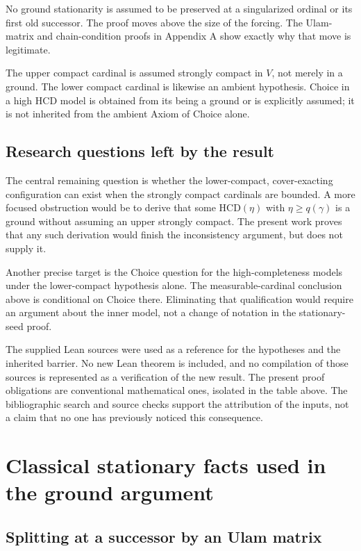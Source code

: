 \documentclass[11pt,letterpaper]{article}
\theoremstyle{definition}
\numberwithin{equation}{section}
\newcommand{\HCD}{\mathrm{HCD}}
\begin{document}
No ground stationarity is assumed to be preserved at a singularized
ordinal or its first old successor. The proof moves above the size of
the forcing. The Ulam-matrix and chain-condition proofs in Appendix A
show exactly why that move is legitimate.

The upper compact cardinal is assumed strongly compact in $V$, not
merely in a ground. The lower compact cardinal is likewise an ambient
hypothesis. Choice in a high $\HCD$ model is obtained from its being a
ground or is explicitly assumed; it is not inherited from the ambient
Axiom of Choice alone.

\subsection{Research questions left by the result}

The central remaining question is whether the lower-compact,
cover-exacting configuration can exist when the strongly compact
cardinals are bounded. A more focused obstruction would be to derive
that some $\HCD(\eta)$ with $\eta\ge q(\gamma)$ is a ground without
assuming an upper strongly compact. The present work proves that any
such derivation would finish the inconsistency argument, but does not
supply it.

Another precise target is the Choice question for the high-completeness
models under the lower-compact hypothesis alone. The measurable-cardinal
conclusion above is conditional on Choice there. Eliminating that
qualification would require an argument about the inner model, not a
change of notation in the stationary-seed proof.

The supplied Lean sources were used as a reference for the hypotheses
and the inherited barrier. No new Lean theorem is included, and no
compilation of those sources is represented as a verification of the
new result. The present proof obligations are conventional mathematical
ones, isolated in the table above. The bibliographic search and source
checks support the attribution of the inputs, not a claim that no one
has previously noticed this consequence.

\appendix
\section{Classical stationary facts used in the ground argument}\label{app:stationary}

\subsection{Splitting at a successor by an Ulam matrix}\label{app:splitting}
\end{document}
